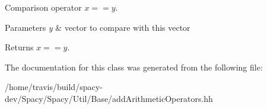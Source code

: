 \-Comparison operator $ x==y$. 


\begin{DoxyParams}{\-Parameters}
{\em y} & vector to compare with this vector \\
\hline
\end{DoxyParams}
\begin{DoxyReturn}{\-Returns}
$ x==y$. 
\end{DoxyReturn}


\-The documentation for this class was generated from the following file\-:\begin{DoxyCompactItemize}
\item 
/home/travis/build/spacy-\/dev/\-Spacy/\-Spacy/\-Util/\-Base/add\-Arithmetic\-Operators.\-hh\end{DoxyCompactItemize}
